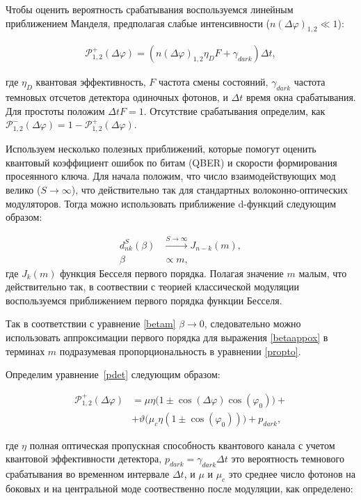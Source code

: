 Чтобы оценить вероятность срабатывания воспользуемся линейным приближением Манделя, предполагая слабые интенсивности ($n(\Delta\varphi)_{1,2} \ll 1$):

\begin{eqnarray}
    \mathcal{P}_{1,2}^{+}(\Delta\varphi)=\left(n(\Delta\varphi)_{1,2}\eta_DF+\gamma_{dark}\right)\Delta t, \label{pdet}
\end{eqnarray}

где $\eta_D$ квантовая эффективность, $F$ частота смены состояний, $\gamma_{dark}$ частота темновых отсчетов детектора одиночных фотонов, и $\Delta t$ время окна срабатывания. Для простоты положим $\Delta t F=1$. Отсутствие срабатывания определим, как $\mathcal{P}_{1,2}^{-}(\Delta\varphi)=1-\mathcal{P}_{1,2}^{+}(\Delta\varphi)$.     


Используем несколько полезных приближений, которые помогут оценить квантовый коэффициент ошибок по битам (QBER) и скорости формирования просеянного ключа. Для начала положим, что число взаимодействующих мод велико ($S\rightarrow \infty$), что действительно так для стандартных волоконно-оптических модуляторов. Тогда можно использовать приближение d-функций следующим образом:

\begin{align}
d_{nk}^S(\beta) &\xrightarrow{S\rightarrow \infty} J_{n-k}(m), \label{limdj} \\
\beta &\propto m, \label{propto}
\end{align}
где $J_k(m)$ функция Бесселя первого порядка. Полагая значение $m$ малым, что действительно так, в соотвествии с теорией классической модуляции воспользуемся приближением первого порядка функции Бесселя. 


Так в соответствии с уравнение \ref{betam} $\beta \rightarrow 0$, следовательно можно использовать аппроксимации первого порядка для выражения \ref{betaappox} в терминах $m$ подразумевая пропорциональность в уравнении \ref{propto}.


Определим уравнение~\ref{pdet} следующим образом:

\begin{align}\label{pdet1}
 \mathcal{P}_{1,2}^{+}(\Delta\varphi)&=\mu\eta\Big(1\pm\cos(\Delta\varphi)\cos(\varphi_0)\Big)+ \nonumber
 \\
 &+\vartheta\Big(\mu_c\eta(1\pm\cos(\varphi_0))\Big)+p_{dark},
\end{align}


где $\eta$ полная оптическая пропускная способность квантового канала с учетом квантовой эффективности детектора, $p_{dark}=\gamma_{dark}\Delta t$ это вероятность темнового срабатывания во временном интервале $\Delta t$, и $\mu$ и $\mu_c$ это среднее число фотонов на боковых и на центральной моде соотвественно после модуляции, как определено:

